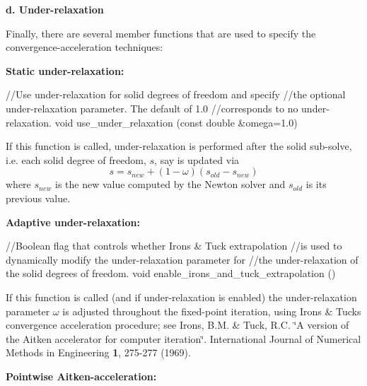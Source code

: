 {\bfseries d. Under-\/relaxation}

Finally, there are several member functions that are used to specify the convergence-\/acceleration techniques\+:
\begin{DoxyEnumerate}
\item {\bfseries Static under-\/relaxation\+:} ~\newline
~\newline

\begin{DoxyCode}
\textcolor{comment}{//Use under-relaxation for solid degrees of freedom and specify }
\textcolor{comment}{//the optional under-relaxation parameter. The default of 1.0 }
\textcolor{comment}{//corresponds to no under-relaxation.}
\textcolor{keywordtype}{void} use\_under\_relaxation (\textcolor{keyword}{const} \textcolor{keywordtype}{double} &omega=1.0)
\end{DoxyCode}
 If this function is called, under-\/relaxation is performed after the solid sub-\/solve, i.\+e. each solid degree of freedom, $ s $, say is updated via \[ s = s_{new} + (1-\omega) (s_{old} - s_{new}) \] where $ s_{new} $ is the new value computed by the Newton solver and $ s_{old} $ is its previous value.
\item {\bfseries Adaptive under-\/relaxation\+:} ~\newline
~\newline

\begin{DoxyCode}
\textcolor{comment}{//Boolean flag that controls whether Irons & Tuck extrapolation}
\textcolor{comment}{//is used to dynamically modify the under-relaxation parameter for}
\textcolor{comment}{//the under-relaxation of the solid degrees of freedom.}
\textcolor{keywordtype}{void} enable\_irons\_and\_tuck\_extrapolation ()
\end{DoxyCode}
 If this function is called (and if under-\/relaxation is enabled) the under-\/relaxation parameter $ \omega $ is adjusted throughout the fixed-\/point iteration, using Irons \& Tucks convergence acceleration procedure; see Irons, B.\+M. \& Tuck, R.\+C. \char`\"{}\+A version of the Aitken accelerator for computer iteration\char`\"{}. International Journal of Numerical Methods in Engineering {\bfseries 1}, 275-\/277 (1969).
\item {\bfseries Pointwise Aitken-\/acceleration\+:} ~\newline
~\newline


\end{DoxyEnumerate}
